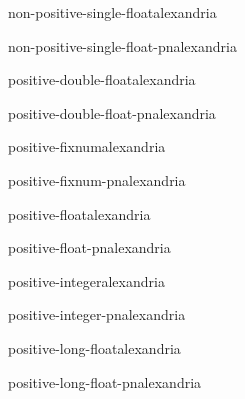 \begin{type}{non-positive-single-float}{}{alexandria}{}
  
\end{type}

\begin{function}{non-positive-single-float-p}{n}{alexandria}{}
  
\end{function}

\begin{type}{positive-double-float}{}{alexandria}{}
  
\end{type}

\begin{function}{positive-double-float-p}{n}{alexandria}{}
  
\end{function}

\begin{type}{positive-fixnum}{}{alexandria}{}
  
\end{type}

\begin{function}{positive-fixnum-p}{n}{alexandria}{}
  
\end{function}

\begin{type}{positive-float}{}{alexandria}{}
  
\end{type}

\begin{function}{positive-float-p}{n}{alexandria}{}
  
\end{function}

\begin{type}{positive-integer}{}{alexandria}{}
  
\end{type}

\begin{function}{positive-integer-p}{n}{alexandria}{}
  
\end{function}

\begin{type}{positive-long-float}{}{alexandria}{}
  
\end{type}

\begin{function}{positive-long-float-p}{n}{alexandria}{}
  
\end{function}

